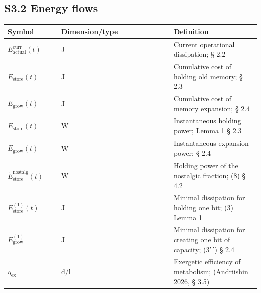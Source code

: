 \documentclass[pdflatex,sn-mathphys-ay]{sn-jnl}
\begin{document}
\subsection*{S3.2 Energy flows}\label{s3.2-energy-flows}



\begin{center}\small
\begin{tabular}{@{} >{\raggedright\arraybackslash}p{0.2105\linewidth} >{\raggedright\arraybackslash}p{0.4474\linewidth} >{\raggedright\arraybackslash}p{0.3421\linewidth}@{}}
\toprule

\begin{minipage}[b]{\linewidth}\raggedright

Symbol

\end{minipage} & \begin{minipage}[b]{\linewidth}\raggedright

Dimension/type

\end{minipage} & \begin{minipage}[b]{\linewidth}\raggedright

Definition

\end{minipage} \\

\midrule

\(E_{\text{actual}}^{\text{curr}}(t)\) & J & Current operational dissipation; § 2.2 \\

\(E_{\text{store}}(t)\) & J & Cumulative cost of holding old memory; § 2.3 \\

\(E_{\text{grow}}(t)\) & J & Cumulative cost of memory expansion; § 2.4 \\

\(\dot{E}_{\text{store}}(t)\) & W & Instantaneous holding power; Lemma 1 § 2.3 \\

\(\dot{E}_{\text{grow}}(t)\) & W & Instantaneous expansion power; § 2.4 \\

\(\dot{E}_{\text{store}}^{\text{nostalg}}(t)\) & W & Holding power of the nostalgic fraction; (8) § 4.2 \\

\(E_{\text{store}}^{(1)}(t)\) & J & Minimal dissipation for holding one bit; (3) Lemma 1 \\

\(E_{\text{grow}}^{(1)}\) & J & Minimal dissipation for creating one bit of capacity; (3'\,') § 2.4 \\

\(\eta_{\text{ex}}\) & d/l & Exergetic efficiency of metabolism; (Andriishin 2026, § 3.5) \\

\bottomrule
\end{tabular}
\end{center}
\end{document}
